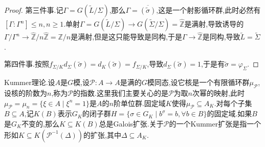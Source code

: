 \begin{enumerate}
\begin{proof}
    	第三件事.记$\Gamma=G(\widetilde{L}/\Sigma)$,那么$\Gamma=\overline{(\widetilde{\sigma})}$,这是一个射影循环群,此时必然有$[\Gamma:\Gamma^n]\le n,n\ge1$.单射$\Gamma=G(\widetilde{L}/\Sigma)\to G(\widetilde{\Sigma}/\Sigma)=\widehat{\mathbb{Z}}$是满射,导致诱导的$\Gamma/\Gamma^n\to\widehat{\mathbb{Z}}/n\widehat{\mathbb{Z}}=\mathbb{Z}/n$是满射,但是这只能导致是同构,于是$\Gamma\to\widehat{\mathbb{Z}}$是同构,导致$\widetilde{L}=\widetilde{\Sigma}$.
    	
    	第四件事.按照$f_{\Sigma/K}d_{\Sigma}(\widetilde{\sigma})=d_K(\widetilde{\sigma})=f_{\Sigma/K}$,导致$d_{\Sigma}(\widetilde{\sigma})=1$,于是有$\widetilde{\sigma}=\varphi_{\Sigma}$.
    \end{proof}
\end{enumerate}

Kummer理论.设$A$是$G$模,设$\mathscr{P}:A\to A$是满的$G$模同态,设它核是一个有限循环群$\mu_{\mathscr{P}}$,设核的阶数为$n$,称为$\mathscr{P}$的指数.这里我们主要关心的是$\mathscr{P}$为取$n$次幂的映射,此时$\mu_{\mathscr{P}}=\mu_n=\{\xi\in A\mid\xi^n=1\}$是$A$的$n$阶单位群.固定域$K$使得$\mu_{\mathscr{P}}\subseteq A_K$.对每个子集$B\subseteq A$,记$K(B)$表示$G_K$的闭子群$H=\{\sigma\in G_K\mid b^{\sigma}=b,\forall b\in B\}$的固定域.如果$B$是$G_K$不变的,那么$K\subseteq K(B)$总是Galois扩张.关于$\mathscr{P}$的一个Kummer扩张是指一个形如$K\subseteq K(\mathscr{P}^{-1}(\Delta))$的扩张,其中$\Delta\subseteq A_K$.

